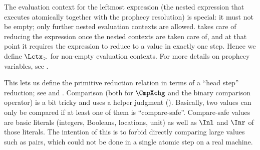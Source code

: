 The  evaluation context for the leftmost expression (the nested expression that executes atomically together with the prophecy resolution) is special: it must not be empty; only further nested evaluation contexts are allowed.
 takes care of reducing the expression once the nested contexts are taken care of, and at that point it requires the expression to reduce to a value in exactly one step.
Hence we define $\Lctx_{>}$ for non-empty evaluation contexts.
For more details on prophecy variables, see \cite{iris:prophecy}.

This lets us define the primitive reduction relation in terms of a ``head step'' reduction; see  and .
Comparison (both for $\CmpXchg$ and the binary comparison operator) is a bit tricky and uses a helper judgment ().
Basically, two values can only be compared if at least one of them is ``compare-safe''.
Compare-safe values are basic literals (integers, Booleans, locations, unit) as well as $\Inl$ and $\Inr$ of those literals.
The intention of this is to forbid directly comparing large values such as pairs, which could not be done in a single atomic step on a real machine.

